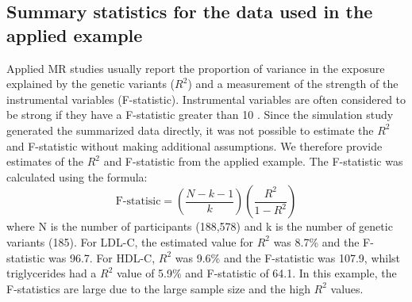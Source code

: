 \documentclass[a4paper,12pt]{article}
\begin{document}
{\begin{bibunit}[wileyj]
\section{Summary statistics for the data used in the applied example}
\normalsize{Applied MR studies usually report the proportion of variance in the exposure explained by the genetic variants ($R^{2}$) and a measurement of the strength of the instrumental variables (F-statistic). Instrumental variables are often considered to be strong if they have a F-statistic greater than 10 \cite{Burgess2011}.  Since the simulation study generated the summarized data directly, it was not possible to estimate the $R^{2}$ and F-statistic without making additional assumptions.  We therefore provide estimates of the $R^{2}$ and F-statistic from the applied example.  The F-statistic was calculated using the formula: 
\begin{equation}
\mbox{F-statisic}=\left(\frac{N-k-1}{k}\right)\left(\frac{R^2}{1-R^2}\right)
\end{equation}
where N is the number of participants (188,578) and k is the number of genetic variants (185).  For LDL-C, the estimated value for $R^{2}$ was 8.7\% and the F-statistic was 96.7.  For HDL-C, $R^{2}$ was 9.6\% and the F-statistic was 107.9, whilst triglycerides had a $R^{2}$ value of 5.9\% and F-statistic of 64.1. In this example, the F-statistics are large due to the large sample size and the high $R^{2}$ values.   
}
\clearpage


\end{bibunit}}
\end{document}

